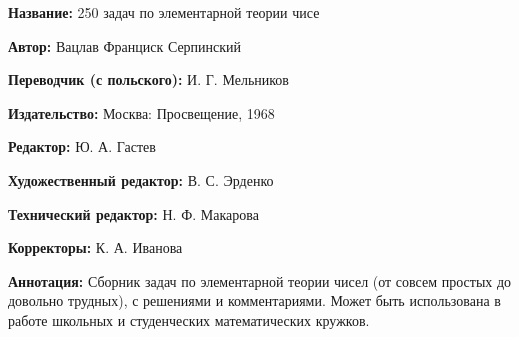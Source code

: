 \documentclass[12pt, a4paper, openany]{book}
\begin{document}
	{\bf Название:} 250 задач по элементарной теории чисе
	
{\bf Автор:} Вацлав Франциск Серпинский

{\bf Переводчик (с польского):} И. Г. Мельников
	
{\bf Издательство:} Москва: Просвещение, 1968
	
		{\bf Редактор:} Ю. А. Гастев
	
		{\bf Художественный редактор:} В. С. Эрденко
	
		{\bf Технический редактор:} Н. Ф. Макарова
	
		{\bf Корректоры:} К. А. Иванова
	
		{\bf Аннотация:} Сборник задач по элементарной теории чисел (от совсем простых до довольно трудных), с решениями и комментариями. Может быть использована в работе школьных и студенческих математических кружков.
		\thispagestyle{empty} %

	
\end{document}
